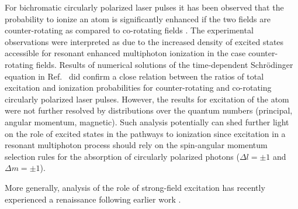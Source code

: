 For bichromatic circularly polarized laser pulses it has been observed that the probability to ionize an atom is significantly enhanced if the two fields are counter-rotating as compared to co-rotating fields \cite{mancuso2016}. The experimental observations were interpreted as due to the increased density of excited states accessible for resonant enhanced multiphoton ionization in the case counter-rotating fields. Results of numerical solutions of the time-dependent Schr\"odinger equation in Ref.\ \cite{mancuso2016} did confirm a close relation between the ratios of total excitation and ionization probabilities for counter-rotating and co-rotating circularly polarized laser pulses. However, the results for excitation of the atom were not further resolved by distributions over the quantum numbers (principal, angular momentum, magnetic). Such analysis potentially can shed further light on the role of excited states in the pathways to ionization since excitation in a resonant multiphoton process should rely on the spin-angular momentum selection rules for the absorption of circularly polarized photons ($\Delta l = \pm 1$ and $\Delta m = \pm 1$).

More generally, analysis of the role of strong-field excitation has recently experienced a renaissance 
\cite{nubbemeyer2008,eichmann2013,chini2014,zimmermann2015} 
following earlier work 
\cite{freeman1987,perry1989,agostini1989}.

